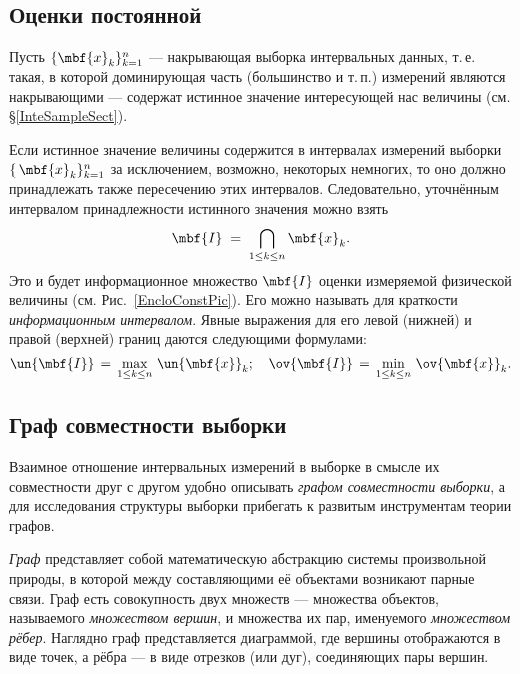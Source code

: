 \documentclass[a5paper,openany]{book}
\begin{document}
\subsection{Оценки постоянной} 
\label{EstConst}

Пусть $\{\mbf{x}_{k}\}_{k=1}^{n}$ --- накрывающая выборка интервальных данных, 
т.\,е. такая, в которой доминирующая часть (большинство и т.\,п.) измерений 
являются накрывающими --- содержат истинное значение интересующей нас величины 
(см. \S\ref{InteSampleSect}). 

Если истинное значение величины содержится в интервалах измерений выборки  $\{\,\mbf{x}_{k}\}_{k=1}^n$ за исключением, возможно, некоторых немногих, то оно 
должно принадлежать также пересечению этих интервалов. Следовательно, уточнённым 
интервалом принадлежности истинного значения можно взять 
\begin{equation} 
	\label{IXInterval} 
	\mbf{I}\; = \;\bigcap_{1\leq k\leq n} \mbf{x}_{k}. 
\end{equation} 
Это и будет информационное множество $\mbf{I}$ оценки измеряемой физичес\-кой величины 
(см. Рис.~\ref{EncloConstPic}). Его можно называть для краткости \emph{информационным 
	интервалом}. Явные выражения для его левой (нижней) и правой (верхней) границ даются 
следующими формулами:                            
\begin{equation}
	\label{LoUpBounds} 
	\un{\mbf{I}}\, = \,\max_{1\leq k\leq n} \,\un{\mbf{x}}_{k};
	\quad
	\ov{\mbf{I}}\, = \,\min_{1\leq k\leq n} \,\ov{\mbf{x}}_{k}. 
\end{equation}           

\subsection{Граф совместности выборки} 
\label{CompatibilityGraph} 

Взаимное отношение интервальных измерений в выборке в смысле их совместности друг 
с другом удобно описывать \emph{графом совместности выборки},  а для исследования структуры выборки прибегать к развитым инструментам теории 
графов. 

\emph{Граф} представляет собой математическую абстракцию системы 
произвольной природы, в которой между составляющими её объектами возникают парные 
связи. Граф есть совокупность двух множеств --- множества объектов, называемого 
\emph{множеством вершин}, и множества их пар, именуемого \emph{множеством рёбер}. 
Наглядно граф представляется диаграммой, где вершины отображаются в виде точек, 
а рёбра --- в виде отрезков (или дуг), соединяющих пары вершин. 
\end{document}
